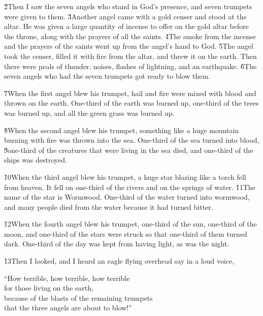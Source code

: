 \v{2}Then I saw the seven angels who stand in God's presence, and seven trumpets were given to them. \v{3}Another angel came with a gold censer and stood at the altar. He was given a large quantity of incense to offer on the gold altar before the throne, along with the prayers of all the saints. \v{4}The smoke from the incense and the prayers of the saints went up from the angel's hand to God. \v{5}The angel took the censer, filled it with fire from the altar, and threw it on the earth. Then there were peals of thunder, noises, flashes of lightning, and an earthquake. \v{6}The seven angels who had the seven trumpets got ready to blow them.

\v{7}When the first angel blew his trumpet, hail and fire were mixed with blood and thrown on the earth. One-third of the earth was burned up, one-third of the trees was burned up, and all the green grass was burned up.

\v{8}When the second angel blew his trumpet, something like a huge mountain burning with fire was thrown into the sea. One-third of the sea turned into blood, \v{9}one-third of the creatures that were living in the sea died, and one-third of the ships was destroyed.

\v{10}When the third angel blew his trumpet, a huge star blazing like a torch fell from heaven. It fell on one-third of the rivers and on the springs of water. \v{11}The name of the star is Wormwood. One-third of the water turned into wormwood, and many people died from the water because it had turned bitter.

\v{12}When the fourth angel blew his trumpet, one-third of the sun, one-third of the moon, and one-third of the stars were struck so that one-third of them turned dark. One-third of the day was kept from having light, as was the night.

\v{13}Then I looked, and I heard an eagle flying overhead say in a loud voice,

\begin{poetry}
\poeml ``How terrible, how terrible, how terrible \\
\poemll    for those living on the earth, \\
\poeml because of the blasts of the remaining trumpets \\
\poemll    that the three angels are about to blow!''
\end{poetry}

